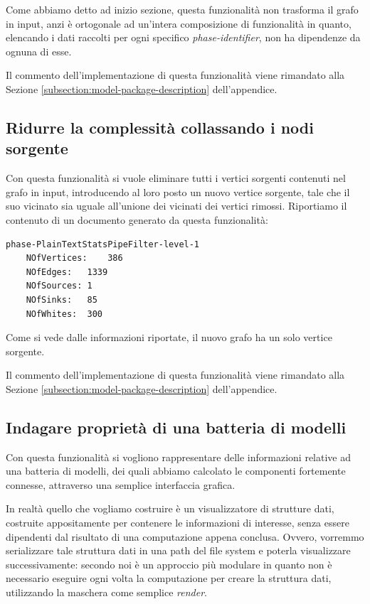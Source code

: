 Come abbiamo detto ad inizio sezione, questa funzionalit\`a non
trasforma il grafo in input, anzi \`e ortogonale ad un'intera
composizione di funzionalit\`a in quanto, elencando i dati raccolti
per ogni specifico \emph{phase-identifier}, non ha dipendenze da
ognuna di esse.

Il commento dell'implementazione di questa funzionalit\`a viene
rimandato alla Sezione \ref{subsection:model-package-description}
dell'appendice.

\subsection{Ridurre la complessit\`a collassando i nodi sorgente}
Con questa funzionalit\`a si vuole eliminare tutti i vertici sorgenti
contenuti nel grafo in input, introducendo al loro posto un nuovo
vertice sorgente, tale che il suo vicinato sia uguale all'unione dei
vicinati dei vertici rimossi. Riportiamo il contenuto di un documento
generato da questa funzionalit\`a:
\begin{lstlisting}
phase-PlainTextStatsPipeFilter-level-1
	NOfVertices:	386
	NOfEdges:	1339
	NOfSources:	1
	NOfSinks:	85
	NOfWhites:	300
\end{lstlisting}
Come si vede dalle informazioni riportate, il nuovo grafo ha un solo
vertice sorgente.

Il commento dell'implementazione di questa funzionalit\`a viene
rimandato alla Sezione \ref{subsection:model-package-description}
dell'appendice.


\subsection{Indagare propriet\`a di una batteria di modelli}
\label{subsection:use-case-result-viewer}
Con questa funzionalit\`a si vogliono rappresentare delle informazioni
relative ad una batteria di modelli, dei quali abbiamo calcolato le
componenti fortemente connesse, attraverso una semplice interfaccia
grafica.

In realt\`a quello che vogliamo costruire \`e un visualizzatore di
strutture dati, costruite appositamente per contenere le informazioni
di interesse, senza essere dipendenti dal risultato di una
computazione appena conclusa. Ovvero, vorremmo serializzare tale
struttura dati in una path del file system e poterla visualizzare
successivamente: secondo noi \`e un approccio pi\`u modulare in quanto
non \`e necessario eseguire ogni volta la computazione per creare la
struttura dati, utilizzando la maschera come semplice \emph{render}.

